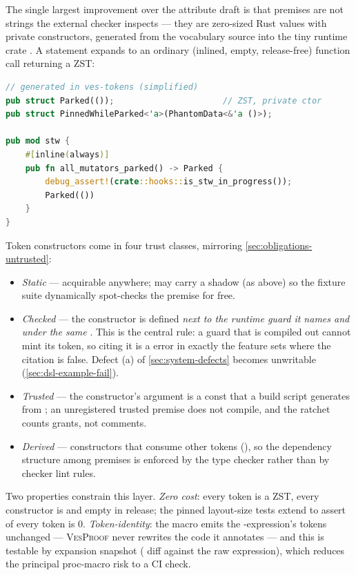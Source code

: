The single largest improvement over the attribute draft is that
premises are not strings the external checker inspects --- they are
zero-sized Rust values with private constructors, generated from the
vocabulary source into the tiny runtime crate . A
 statement expands to an ordinary (inlined, empty,
release-free) function call returning a ZST:

\begin{lstlisting}[language=Rust]
// generated in ves-tokens (simplified)
pub struct Parked(());                      // ZST, private ctor
pub struct PinnedWhileParked<'a>(PhantomData<&'a ()>);

pub mod stw {
    #[inline(always)]
    pub fn all_mutators_parked() -> Parked {
        debug_assert!(crate::hooks::is_stw_in_progress());
        Parked(())
    }
}
\end{lstlisting}

Token constructors come in four trust classes, mirroring
\cref{sec:obligations-untrusted}:

\begin{itemize}[leftmargin=1.4em]
\item \emph{Static} --- acquirable anywhere; may carry a
   shadow (as above) so the fixture suite
  dynamically spot-checks the premise for free.
\item \emph{Checked} --- the constructor is defined \emph{next to the
  runtime guard it names and under the same }. This is the
  central rule: a guard that is compiled out cannot mint its
  token, so citing it is a  error in exactly the feature
  sets where the citation is false. Defect (a) of
  \cref{sec:system-defects} becomes unwritable
  (\cref{sec:dsl-example-fail}).
\item \emph{Trusted} --- the constructor's argument is a
   const that a build script generates from
  ; an unregistered trusted premise does not
  compile, and the ratchet counts grants, not comments.
\item \emph{Derived} --- constructors that consume other tokens
  (), so the dependency
  structure among premises is enforced by the type checker rather
  than by checker lint rules.
\end{itemize}

Two properties constrain this layer. \emph{Zero cost}: every token
is a ZST, every constructor is  and empty in
release; the pinned layout-size tests extend to assert
 of every token is 0. \emph{Token-identity}: the macro
emits the -expression's tokens unchanged --- \textsc{VesProof}
never rewrites the  code it annotates --- and this is
testable by expansion snapshot ( diff against the
raw expression), which reduces the principal proc-macro risk to a CI
check.

